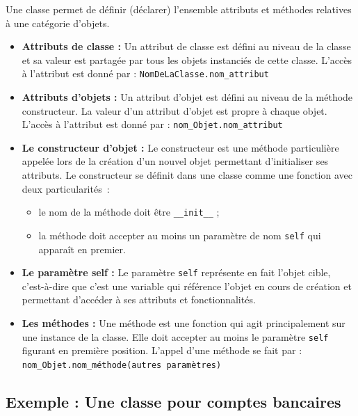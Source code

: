 \documentclass[%
oneside,                 %
final,                   %
10pt]{article}
\begin{document}
Une classe permet de définir (déclarer) l'ensemble attributs et méthodes relatives à une catégorie d'objets.
\begin{itemize}
\item \textbf{Attributs de classe :} Un attribut de classe est défini au niveau de la classe et sa valeur est partagée par tous les objets instanciés de cette classe. L'accès à l'attribut est donné par : \Verb!NomDeLaClasse.nom_attribut!

\item \textbf{Attributs d'objets :} Un attribut d'objet est défini au niveau de la méthode constructeur. La valeur d'un attribut d'objet est propre à chaque objet. L'accès à l'attribut est donné par : \Verb!nom_Objet.nom_attribut!

\item \textbf{Le constructeur d'objet :} Le constructeur est une méthode particulière appelée lors de la création d'un nouvel objet permettant d'initialiser ses attributs. Le constructeur se définit dans une classe comme une fonction avec deux particularités~:
\begin{itemize}

  \item le nom de la méthode doit être \Verb!__init__! ;

  \item la méthode doit accepter au moins un paramètre de nom \texttt{self} qui apparaît en premier.

\end{itemize}

\noindent
\item \textbf{Le paramètre self :} Le paramètre \texttt{self} représente en fait l'objet cible, c'est-à-dire que c'est une variable qui référence l'objet en cours de création et permettant d'accéder à ses attributs et fonctionnalités.

\item \textbf{Les méthodes :} Une méthode est une fonction qui agit principalement sur une instance de la classe. Elle doit accepter au moins le paramètre \texttt{self} figurant en première position. L'appel d'une méthode se fait par : \Verb!nom_Objet.nom_méthode(autres paramètres)!
\end{itemize}

\noindent
\subsection{Exemple : Une classe pour comptes bancaires}
\end{document}
